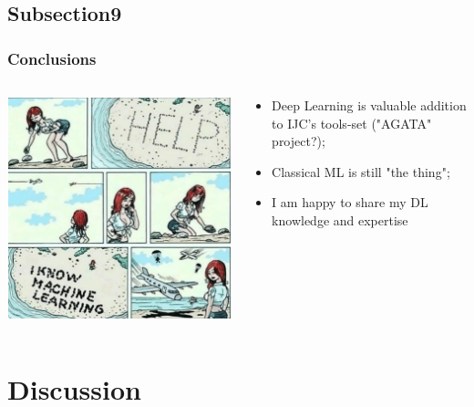 \documentclass[10pt, xcolor=x11names,compress]{beamer}
\begin{document}
\subsection{Subsection9}
\begin{frame}
\frametitle{Conclusions}
\begin{columns}
	\begin{column}{0.6\textwidth}
		\centering
		\includegraphics[height=0.7\textheight]{images/i-know-ml.png}
	\end{column}
	\begin{column}{0.4\textwidth}
		
		\begin{itemize}
			\item Deep Learning is valuable addition to IJC's tools-set ("AGATA" project?);
			\item Classical ML is still "the thing";
			\item I am happy to share my DL knowledge and expertise
		\end{itemize}
	\end{column}
\end{columns}
\end{frame}

\section{Discussion}
\end{document}
